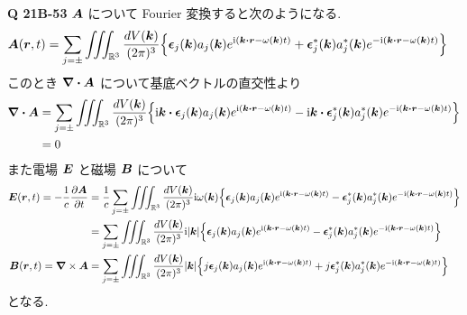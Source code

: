 \documentclass[uplatex,a4paper,dvipdfmx]{jsarticle}
\theoremstyle{definition}
\begin{document}
\textbf{Q 21B-53}
$\AA$ について Fourier 変換すると次のようになる.
\begin{align}
  \AA(\rr, t) & = \sum_{j=\pm}\iiint_{\RR^3}\frac{dV(\kk)}{(2\pi)^3}\qty{\ee_j(\kk)a_j(\kk)e^{\ii(\kk\vdot\rr - \omega(\kk)t)} + \ee_j^*(\kk)a_j^*(\kk)e^{-\ii(\kk\vdot\rr - \omega(\kk)t)}}
\end{align}
このとき $\vnabla\vdot\AA$ について基底ベクトルの直交性より
\begin{align}
  \vnabla\vdot\AA & = \sum_{j=\pm}\iiint_{\RR^3}\frac{dV(\kk)}{(2\pi)^3}\qty{\ii\kk\vdot\ee_j(\kk)a_j(\kk)e^{\ii(\kk\vdot\rr - \omega(\kk)t)} - \ii\kk\vdot\ee_j^*(\kk)a_j^*(\kk)e^{-\ii(\kk\vdot\rr - \omega(\kk)t)}} \\
                  & = 0
\end{align}
また電場 $\EE$ と磁場 $\BB$ について
\begin{align}
  \EE(\rr, t) = -\frac{1}{c}\pdv{\AA}{t} & = \frac{1}{c}\sum_{j=\pm}\iiint_{\RR^3}\frac{dV(\kk)}{(2\pi)^3}\ii\omega(\kk)\qty{\ee_j(\kk)a_j(\kk)e^{\ii(\kk\vdot\rr - \omega(\kk)t)} - \ee_j^*(\kk)a_j^*(\kk)e^{-\ii(\kk\vdot\rr - \omega(\kk)t)}} \\
                                         & = \sum_{j=\pm}\iiint_{\RR^3}\frac{dV(\kk)}{(2\pi)^3}\ii|\kk|\qty{\ee_j(\kk)a_j(\kk)e^{\ii(\kk\vdot\rr - \omega(\kk)t)} - \ee_j^*(\kk)a_j^*(\kk)e^{-\ii(\kk\vdot\rr - \omega(\kk)t)}}                  \\
  \BB(\rr, t) = \vnabla\times\AA         & = \sum_{j=\pm}\iiint_{\RR^3}\frac{dV(\kk)}{(2\pi)^3}|\kk|\qty{j\ee_j(\kk)a_j(\kk)e^{\ii(\kk\vdot\rr - \omega(\kk)t)} + j\ee_j^*(\kk)a_j^*(\kk)e^{-\ii(\kk\vdot\rr - \omega(\kk)t)}}
\end{align}
となる. \\
\end{document}
